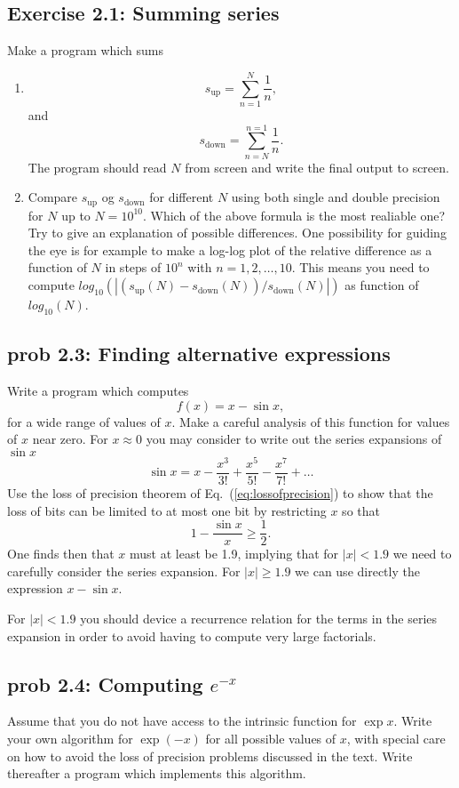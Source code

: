 \subsection*{Exercise 2.1: Summing series}

Make a program which sums
\begin{enumerate}
\item
\[
   s_{\mathrm{up}}=\sum_{n=1}^{N}\frac{1}{n},
\]
and
\[
   s_{\mathrm{down}}=\sum_{n=N}^{n=1}\frac{1}{n}.
\]
The program should read $N$ from screen and write the final output to screen.
\item
Compare  $s_{\mathrm{up}}$ og $s_{\mathrm{down}}$ for different $N$ 
using both single and double precision for $N$ up to $N=10^{10}$.
Which of the above formula is the most realiable one? 
Try to give an explanation of possible differences. 
One possibility for guiding the eye is 
for example to make  
a log-log plot of the  relative difference as a function of  $N$ in steps of $10^n$
with $n=1,2,\dots,10$. This means you need to compute 
$log_{10}(|(s_{\mathrm{up}}(N)-s_{\mathrm{down}}(N))/s_{\mathrm{down}}(N)|)$
as function of  $log_{10}(N)$. 
\end{enumerate}



\subsection*{prob 2.3: Finding alternative expressions}

Write a program which computes 
\[
   f(x) = x -\sin{x},
\]
for a wide range of values of $x$.  Make a careful analysis of this function for values
of $x$ near zero. For $x \approx 0$ you may consider to write out the series expansions of 
$\sin{x}$
\[
   \sin{x} = x -\frac{x^3}{3!}+\frac{x^5}{5!}-\frac{x^7}{7!}+\dots
\]
Use the loss of precision theorem of Eq.~(\ref{eq:lossofprecision})  to show that the loss of bits 
can be limited to at most one bit by restricting $x$ so that
\[
  1-\frac{\sin{x}}{x}  \ge \frac{1}{2}.
\]
One finds then that $x$ must at least be 1.9, implying that for $|x| < 1.9$ we need to carefully
consider the series expansion. For $|x|\ge 1.9$ we can use directly the expression
$x-\sin{x}$.  

For $|x| < 1.9$ you should device a recurrence relation for the terms in the series
expansion in order to avoid having to compute very large factorials.




\subsection*{prob 2.4: Computing $e^{-x}$}
Assume that you do not have access to the intrinsic function for $\exp{x}$. Write your own
algorithm for $\exp{(-x)}$  for all possible values of $x$, with special care on how to 
avoid the loss of precision problems
discussed in the text.  Write thereafter a program which implements this algorithm.



